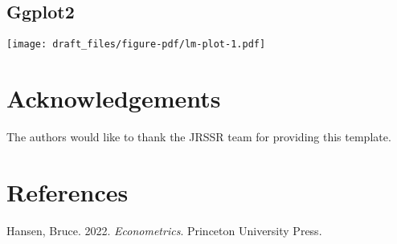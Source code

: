 \documentclass[letterpaper,twoside,12pt]{article}
\newlength{\cslhangindent}
\newenvironment{CSLReferences}[2] %
 {\begin{list}{}{%
  \setlength{\itemindent}{0pt}
  \setlength{\leftmargin}{0pt}
  \setlength{\parsep}{0pt}
  \ifodd #1
   \setlength{\leftmargin}{\cslhangindent}
   \setlength{\itemindent}{-1\cslhangindent}
  \fi
  \setlength{\itemsep}{#2\baselineskip}}}
 {\end{list}}
\begin{document}
\subsection{Ggplot2}\label{ggplot2}

\texttt{[image: draft\_files/figure-pdf/lm-plot-1.pdf]}

\section{Acknowledgements}\label{acknowledgements}

The authors would like to thank the JRSSR team for providing this
template.

\section*{References}\label{references}

\label{refs}
\begin{CSLReferences}{1}{0}
Hansen, Bruce. 2022. \emph{Econometrics}. Princeton University Press.

\end{CSLReferences}
\end{document}
